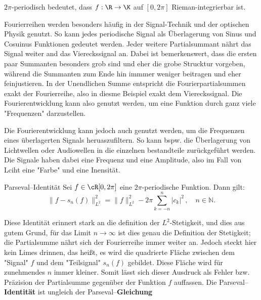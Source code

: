 \begin{bemerkungbox}
    $2\pi$-periodisch bedeutet, dass $f:\R\to\K$ auf $[0,2\pi]$ Rieman-integrierbar ist.
\end{bemerkungbox}

\begin{beispielbox}
    Fourierreihen werden besonders häufig in der Signal-Technik und der optischen Physik genutzt. So kann jedes periodische Signal als Überlagerung von Sinus und Cosuinus Funktionen gedeutet werden. Jeder weitere Partialsummant nährt das Signal weiter and das Viereckssignal an. 
    Dabei ist bemerkenswert, dass die ersten paar Summanten besonders grob sind und eher die grobe Strucktur vorgeben, während die Summanten zum Ende hin immmer weniger beitragen und eher feinjustieren.
    In der Unendlichen Summe entspricht die Fourierpartialsummen exakt der Fourierreihe, also in diesme Beispiel exakt dem Viereckssignal. 
    Die Fourierentwicklung kann also genutzt werden, um eine Funktion durch ganz viele "Frequenzen" darzustellen. 

    Die Fourierentwicklung kann jedoch auch genutzt werden, um die Frequenzen eines überlagerten Signals heruaszufiltern.
    So kann bspw. die Überlagerung von Lichtwellen oder Audiowellen in die einzelnen bestandteile zurückgeführt werden.
    Die Signale haben dabei eine Frequenz und eine Amplitude, also im Fall von Lciht eine "Farbe" und eine Inensität.
\end{beispielbox}

\begin{lemma}{Parseval--Identität}
    Sei $f\in \cR[0,2\pi]$ eine $2\pi$-periodische Funktion. Dann gilt:
    $$
        \|f - s_n(f)\|_{L^2}^2
         = \|f\|_{L^2}^2 - 2\pi \sum_{k=-n}^{n} |c_k|^2 \, , \quad n \in \mathbb{N}.
    $$
\end{lemma}
Diese Identität erinnert stark an die definition der $L^2$-Stetigkeit, und dies aus gutem Grund, für das Limit $n \to \infty$ ist dies genau die Definition der Stetigkeit; die Partialsumme nährt sich der Fourierreihe immer weiter an.
Jedoch steckt hier kein Limes drinnen, das heißt, es wird die quadrierte Fläche zwischen dem "Signal" $f$ und dem "Teilsignal" $s_n(f)$ gebildet. Diese Fläche wird für zunehmendes $n$ immer kleiner. Somit lässt sich dieser Ausdruck als Fehler bzw. Präzision der Partialsumme gegenüber der Funktion $f$ auffassen.
Die Parseval--\textbf{Identität} ist ungleich der Parseval--\textbf{Gleichung}

